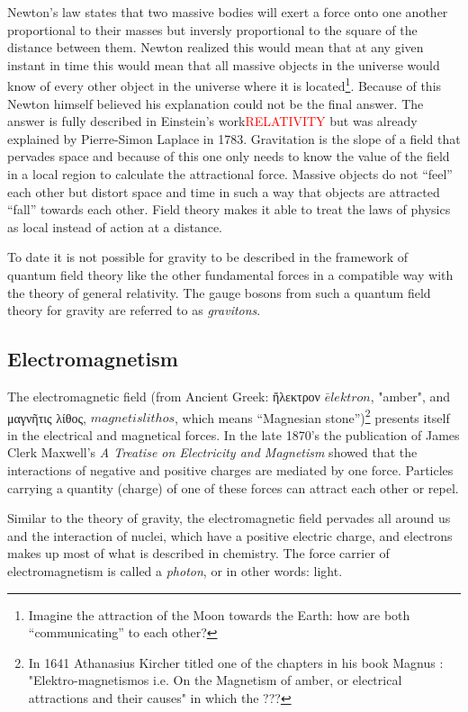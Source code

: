 Newton's law states that two massive bodies will exert a force onto one another proportional to their masses but inversly proportional to the square of the distance between them. Newton realized this would mean that at any given instant in time this would mean that all massive objects in the universe would know of every other object in the universe where it is located\footnote{Imagine the attraction of the Moon towards the Earth: how are both ``communicating'' to each other?}. Because of this Newton himself believed his explanation could not be the final answer. The answer is fully described in Einstein's work\textcolor{red}{RELATIVITY} but was already explained by Pierre-Simon Laplace in 1783. Gravitation is the slope of a field that pervades space and because of this one only needs to know the value of the field in a local region to calculate the attractional force.
Massive objects do not ``feel'' each other but distort space and time in such a way that objects are attracted ``fall'' towards each other. Field theory makes it able to treat the laws of physics as local instead of action at a distance.


To date it is not possible for gravity to be described in the framework of quantum field theory like the other fundamental forces in a compatible way with the theory of general relativity. The gauge bosons from such a quantum field theory for gravity are referred to as \textit{gravitons}.

\subsection*{Electromagnetism}
The electromagnetic field (from Ancient Greek: \gr ἤλεκτρον \en $\bar{e}lektron$, "amber", and \gr μαγνῆτις λίθος, \en $magnetis lithos$, which means ``Magnesian stone'')\footnote{In 1641 Athanasius Kircher titled one of the chapters in his book Magnus \cite{BLABLABLA}: "Elektro-magnetismos i.e. On the Magnetism of amber, or electrical attractions and their causes" in which the ???} presents itself in the electrical and magnetical forces. In the late 1870's the publication of James Clerk Maxwell's \textit{A Treatise on Electricity and Magnetism} showed that the interactions of negative and positive charges are mediated by one force. Particles carrying a quantity (charge) of one of these forces can attract each other or repel.

Similar to the theory of gravity, the electromagnetic field pervades all around us and the interaction of nuclei, which have a positive electric charge, and electrons makes up most of what is described in chemistry. The force carrier of electromagnetism is called a \textit{photon}, or in other words: light.
